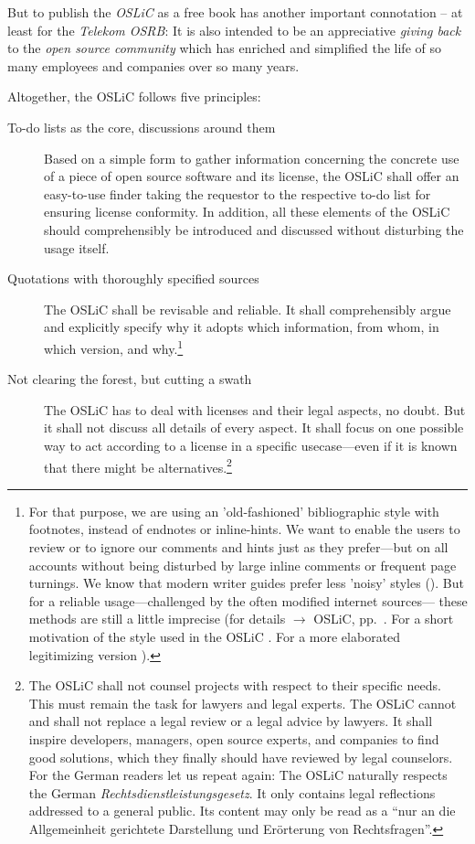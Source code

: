 But to publish the \emph{OSLiC} as a free book has another important connotation --
at least for the \emph{Telekom OSRB}: It is also intended to be an appreciative
\emph{giving back} to the \emph{open source community} which has enriched and
simplified the life of so many employees and companies over so many years.

Altogether, the OSLiC follows five principles:

\begin{description}
  \item[To-do lists as the core, discussions around them] Based on a simple
  form to gather information concerning the concrete use of a piece of open
  source software and its license, the OSLiC shall offer an easy-to-use finder
  taking the requestor to the respective to-do list for ensuring license
  conformity. In addition, all these elements of the OSLiC should comprehensibly
  be introduced and discussed without disturbing the usage itself.

  \item[Quotations with thoroughly specified sources]\label{QuotationPrinciple}
  The OSLiC shall be revisable and reliable. It shall comprehensibly argue and
  explicitly specify why it adopts which information, from whom, in which
  version, and why.\footnote{For that purpose, we are using an 'old-fashioned'
  bibliographic style with footnotes, instead of endnotes or inline-hints.
  We want to enable the users to review or to ignore our comments and hints just
  as they prefer---but on all accounts without being disturbed by large inline
  comments or frequent page turnings. We know that modern writer guides prefer
  less 'noisy' styles (\cite[pars pro toto cf.][\nopage passim]{Mla2009a}). But
  for a reliable usage---challenged by the often modified internet sources---%
  these methods are still a little imprecise (for details $\rightarrow$ OSLiC,
  pp.\ \pageref{sec:QuotationAppendix}. For a short motivation of the style used
  in the OSLiC \cite[cf.][\nopage passim]{Reincke2012a}. For a more elaborated
  legitimizing version \cite[cf.][\nopage passim]{Reincke2012b}).}

  \item[Not clearing the forest, but cutting a swath] The OSLiC has to deal with
  licenses and their legal aspects, no doubt. But it shall not discuss all
  details of every aspect. It shall focus on one possible way to act according
  to a license in a specific usecase---even if it is known that there might be
  alternatives.\footnote{The OSLiC shall not counsel projects with respect to
  their specific needs. This must remain the task for lawyers and legal experts.
  The OSLiC cannot and shall not replace a legal review or a legal advice by
  lawyers. It shall inspire developers, managers, open source experts, and
  companies to find good solutions, which they finally should have reviewed by
  legal counselors. For the German readers let us repeat again: The
  OSLiC naturally respects the German \emph{Rechtsdienstleistungsgesetz}. It only
  contains legal reflections addressed to a general public. Its content may only
  be read as a \enquote{nur an die Allgemeinheit gerichtete Darstellung und
  Erörterung von Rechtsfragen}.}
  

\end{description}
